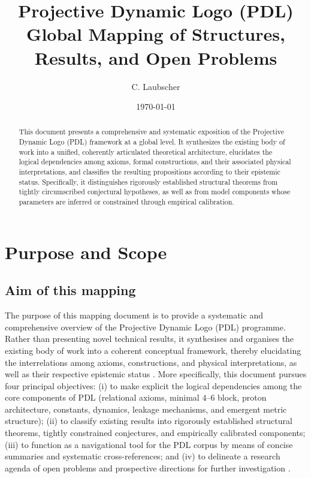 \documentclass[11pt,a4paper]{article}
\title{Projective Dynamic Logo (PDL)\\
Global Mapping of Structures, Results, and Open Problems}
\author{C. Laubscher}
\date{\today}
\begin{document}
\setcounter{tocdepth}{1}

\maketitle

\begin{abstract}
This document presents a comprehensive and systematic exposition of the Projective Dynamic Logo (PDL) framework at a global level. It synthesizes the existing body of work into a unified, coherently articulated theoretical architecture, elucidates the logical dependencies among axioms, formal constructions, and their associated physical interpretations, and classifies the resulting propositions according to their epistemic status. Specifically, it distinguishes rigorously established structural theorems from tightly circumscribed conjectural hypotheses, as well as from model components whose parameters are inferred or constrained through empirical calibration.
\end{abstract}
\tableofcontents

\section{Purpose and Scope}
\label{sec:purpose_scope}

\subsection{Aim of this mapping}
\label{subsec:aim}

The purpose of this mapping document is to provide a systematic and comprehensive overview of the Projective Dynamic Logo (PDL) programme. Rather than presenting novel technical results, it synthesises and organises the existing body of work into a coherent conceptual framework, thereby elucidating the interrelations among axioms, constructions, and physical interpretations, as well as their respective epistemic status \citep{PDL_position,PDL_intro}. More specifically, this document pursues four principal objectives: (i) to make explicit the logical dependencies among the core components of PDL (relational axioms, minimal $4$--$6$ block, proton architecture, constants, dynamics, leakage mechanisms, and emergent metric structure); (ii) to classify existing results into rigorously established structural theorems, tightly constrained conjectures, and empirically calibrated components; (iii) to function as a navigational tool for the PDL corpus by means of concise summaries and systematic cross-references; and (iv) to delineate a research agenda of open problems and prospective directions for further investigation \citep{PDL_position}.
\end{document}
